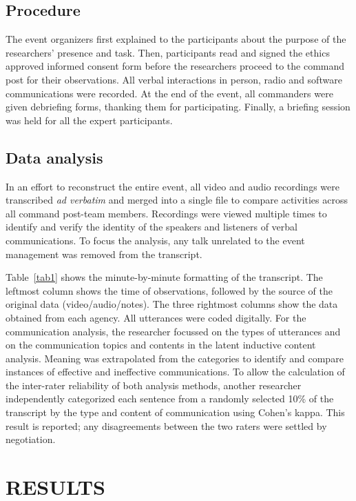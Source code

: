\documentclass[link]{IWCOMP}
\begin{document}
\subsection{Procedure}\label{subsec3.4}

The event organizers first explained to the participants about the purpose
of the researchers' presence and task. Then, participants read and signed
the ethics approved informed consent form before the researchers proceed to
the command post for their observations. All verbal interactions in person,
radio and software communications were recorded. At the end of the event,
all commanders were given debriefing forms, thanking them for participating.
Finally, a briefing session was held for all the expert participants.

\subsection{Data analysis}\label{subsec3.5}

In an effort to reconstruct the entire event, all video and audio recordings
were transcribed \textit{ad verbatim} and merged into a single file to compare activities across
all command post-team members. Recordings were viewed multiple times to
identify and verify the identity of the speakers and listeners of verbal
communications. To focus the analysis, any talk unrelated to the event
management was removed from the transcript.

Table~\ref{tab1} shows the minute-by-minute formatting of the transcript. The
leftmost column shows the time of observations, followed by the source of
the original data (video/audio/notes). The three rightmost columns show the
data obtained from each agency. All utterances were coded digitally. For the
communication analysis, the researcher focussed on the types of utterances
and on the communication topics and contents in the latent inductive content
analysis. Meaning was extrapolated from the categories to identify and
compare instances of effective and ineffective communications. To allow the
calculation of the inter-rater reliability of both analysis methods, another
researcher independently categorized each sentence from a randomly selected
10{\%} of the transcript by the type and content of communication using
Cohen's kappa. This result is reported; any disagreements between the two
raters were settled by negotiation.

\section{RESULTS}\label{sec4}
\end{document}
